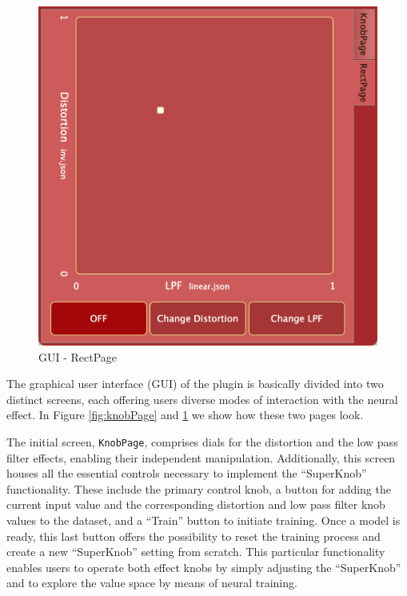 \documentclass{article}
\newcommand{\quotes}[1]{``#1''}
\begin{document}
\begin{sloppy}
\begin{figure}[t]
  \centering
  \centerline{\includegraphics[width=\columnwidth]{images/rectPage.png}}
  \caption{GUI - RectPage}
  \label{fig:rectPage}
\end{figure}

The graphical user interface (GUI) of the plugin is basically divided into two distinct screens, each offering users diverse modes of interaction with the neural effect. In Figure \ref{fig:knobPage} and \ref{fig:rectPage} we show how these two pages look. 

The initial screen, \texttt{KnobPage}, comprises dials for the distortion and the low pass filter effects, enabling their independent manipulation. Additionally, this screen houses all the essential controls necessary to implement the \quotes{SuperKnob} functionality. These include the primary control knob, a button for adding the current input value and the corresponding distortion and low pass filter knob values to the dataset, and a \quotes{Train} button to initiate training. Once a model is ready, this last button offers the possibility to reset the training process and create a new \quotes{SuperKnob} setting from scratch. This particular functionality enables users to operate both effect knobs by simply adjusting the \quotes{SuperKnob} and to explore the value space by means of neural training.


\end{sloppy}
\end{document}
